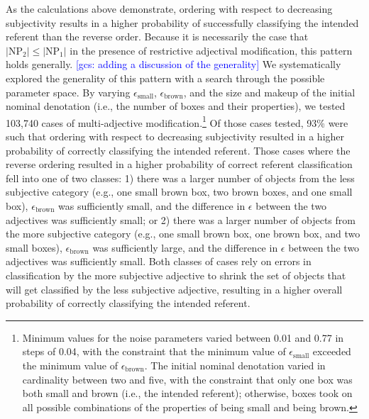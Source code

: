 \documentclass[preprint,authoryear]{elsarticle}\frenchspacing
\newcommand{\gcs}[1]{\textcolor{blue}{[gcs: #1]}}
\begin{document}
As the calculations above demonstrate, ordering with respect to decreasing subjectivity results in a higher probability of successfully classifying the intended referent than the reverse order. Because it is necessarily the case that $|\textrm{NP}_2| \leq |\textrm{NP}_1|$ in the presence of restrictive adjectival modification, this pattern holds generally. \gcs{adding a discussion of the generality} We systematically explored the generality of this pattern with a search through the possible parameter space. By varying $\epsilon_{\textrm{small}}$, $\epsilon_{\textrm{brown}}$, and the size and makeup of the initial nominal denotation (i.e., the number of boxes and their properties), we tested 103,740 cases of multi-adjective modification.\footnote{Minimum values for the noise parameters varied between 0.01 and 0.77 in steps of 0.04, with the constraint that the minimum value of $\epsilon_{\textrm{small}}$ exceeded the minimum value of $\epsilon_{\textrm{brown}}$. The initial nominal denotation varied in cardinality between two and five, with the constraint that only one box was both small and brown (i.e., the intended referent); otherwise, boxes took on all possible combinations of the properties of being small and being brown.} Of those cases tested, 93\% were such that ordering with respect to decreasing subjectivity resulted in a higher probability of correctly classifying the intended referent. Those cases where the reverse ordering resulted in a higher probability of correct referent classification fell into one of two classes: 1) there was a larger number of objects from the less subjective category (e.g., one small brown box, two brown boxes, and one small box), $\epsilon_{\textrm{brown}}$ was sufficiently small, and the difference in $\epsilon$ between the two adjectives was sufficiently small; or 2) there was a larger number of objects from the more subjective category (e.g., one small brown box, one brown box, and two small boxes), $\epsilon_{\textrm{brown}}$ was sufficiently large, and the difference in $\epsilon$ between the two adjectives was sufficiently small. Both classes of cases rely on errors in classification by the more subjective adjective to shrink the set of objects that will get classified by the less subjective adjective, resulting in a higher overall probability of correctly classifying the intended referent.
\end{document}
